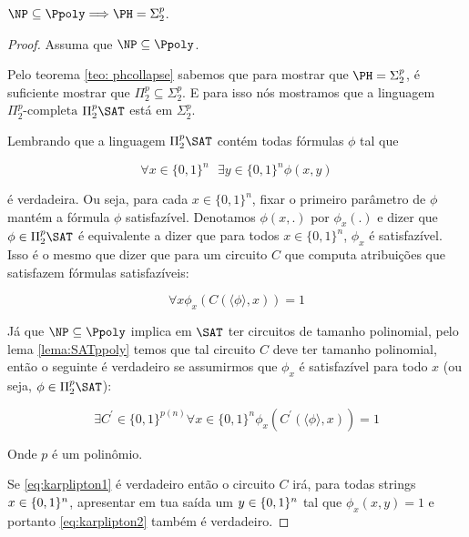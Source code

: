 \begin{teo} 

$\NP \subseteq \Ppoly \Longrightarrow \PH = \Sigma_{2}^{p}$.

\end{teo}

\begin{proof}

\hfill

Assuma que $\NP \subseteq \Ppoly$.

Pelo teorema \ref{teo: phcollapse} sabemos que para mostrar que $\PH = \Sigma_{2}^{p}$, é suficiente mostrar que $\Pi_{2}^{p} \subseteq \Sigma_{2}^{p}$. E para isso nós mostramos que a linguagem $\Pi_{2}^{p}\text{-completa}$ $\Pi_{2}^{p}\SAT$ está em $\Sigma_{2}^{p}$.

Lembrando que a linguagem $\Pi_{2}^{p}\SAT$ contém todas fórmulas $\phi$ tal que

\begin{equation} \label{eq:karplipton1}
    \forall x \in \{0, 1\}^{n} \text{ } \exists y \in \{0, 1\}^{n} \phi(x, y)
\end{equation}

é verdadeira. Ou seja, para cada $x \in \{0, 1\}^{n}$, fixar o primeiro parâmetro de $\phi$ mantém a fórmula $\phi$ satisfazível. Denotamos $\phi(x, .)$ por $\phi_{x}(.)$ e dizer que $\phi \in \Pi_{2}^{p}\SAT$ é equivalente a dizer que para todos $x \in \{0, 1\}^{n}$, $\phi_{x}$ é satisfazível. Isso é o mesmo que dizer que para um circuito $C$ que computa atribuições que satisfazem fórmulas satisfazíveis:

\begin{equation*}
\forall x \phi_{x}(C(\langle \phi \rangle, x)) = 1
\end{equation*}

Já que $\NP \subseteq \Ppoly$ implica em $\SAT$ ter circuitos de tamanho polinomial, pelo lema \ref{lema:SATppoly} temos que tal circuito $C$ deve ter tamanho polinomial, então o seguinte é verdadeiro se assumirmos que $\phi_{x}$ é satisfazível para todo $x$ (ou seja, $\phi \in \Pi_{2}^{p}\SAT$):

\begin{equation} \label{eq:karplipton2}
\exists C^{\prime} \in \{0, 1\}^{p(n)} \forall x \in \{0, 1\}^{n} \phi_{x}(C^{\prime}(\langle \phi \rangle, x)) = 1
\end{equation}

Onde $p$ é um polinômio.

Se \ref{eq:karplipton1} é verdadeiro então o circuito $C$ irá, para todas strings $x \in \{0, 1\}^{n}$, apresentar em tua saída um $y \in \{0, 1\}^{n}$ tal que $\phi_{x}(x, y) = 1$ e portanto \ref{eq:karplipton2} também é verdadeiro.


\end{proof}
